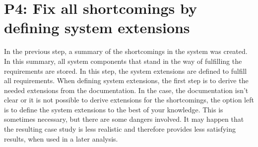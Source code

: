 \section{P4: Fix all shortcomings by defining system extensions}
\label{cs_cocome_ext}
In the previous step, a summary of the shortcomings in the system was created. In this summary, all system components that stand in the way of fulfilling the requirements are stored. In this step, the system extensions are defined to fulfill all requirements. When defining system extensions, the first step is to derive the needed extensions from the documentation.  In the case, the documentation isn't clear or it is not possible to derive extensions for the shortcomings, the option left is to define the system extensions to the best of your knowledge. This is sometimes necessary, but there are some dangers involved. It may happen that the resulting case study is less realistic and therefore provides less satisfying results, when used in a later analysis.
